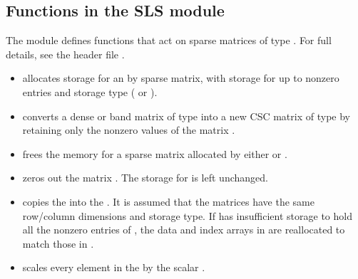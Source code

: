 \subsection{Functions in the SLS module}\label{ss:sls_functions}

The {\sls} module defines functions that act on sparse matrices of
type .  For full details, see the header file .
%
\begin{itemize}

\item {}
  \par {} allocates storage for an  by 
  sparse matrix, with storage for up to  nonzero entries and  
  storage type ( or ).

\item {}
  \par {} converts a dense or band matrix  of type
   into a new CSC matrix of type  by retaining
  only the nonzero values of the matrix .

\item {}
  \par {} frees the memory for a sparse matrix
   allocated by either  or .

\item \ID{}
  \par {} zeros out the  matrix .
  The storage for  is left unchanged.

\item {}
  \par {} copies the   into the
   .  It is assumed that the matrices have the same
  row/column dimensions and storage type.  If  has insufficient 
  storage to hold all the nonzero entries of , the data and 
  index arrays in  are reallocated to match those in .

\item {}
  \par {} scales every element in the
    by the  scalar .


\end{itemize}
